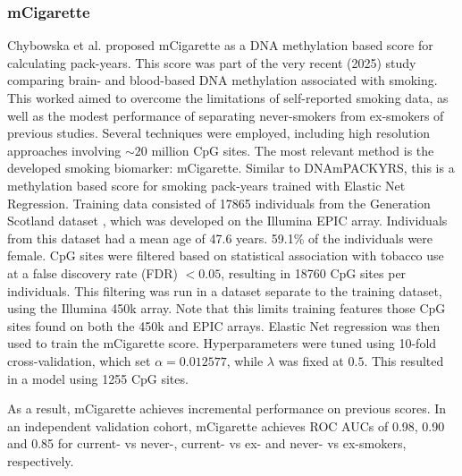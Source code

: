 \documentclass{article}
\begin{document}

\subsubsection{mCigarette} \label{sec:mcigarette}
Chybowska et al. \cite{chybowska2025blood} proposed mCigarette as a DNA methylation based score for calculating pack-years. This score was part of the very recent (2025) study comparing brain- and blood-based DNA methylation associated with smoking. This worked aimed to overcome the limitations of self-reported smoking data, as well as the modest performance of separating never-smokers from ex-smokers of previous studies. Several techniques were employed, including high resolution approaches involving \(\sim \! 20\) million CpG sites. The most relevant method is the developed smoking biomarker: mCigarette. Similar to DNAmPACKYRS, this is a methylation based score for smoking pack-years trained with Elastic Net Regression. Training data consisted of \num{17865} individuals from the Generation Scotland dataset \cite{smith2006generation}, which was developed on the Illumina EPIC array. Individuals from this dataset had a mean age of 47.6 years. 59.1\% of the individuals were female. CpG sites were filtered based on statistical association with tobacco use at a false discovery rate (FDR) \(< 0.05\), resulting in \num{18760} CpG sites per individuals. This filtering was run in a dataset separate to the training dataset, using the Illumina 450k array. Note that this limits training features those CpG sites found on both the 450k and EPIC arrays. Elastic Net regression was then used to train the mCigarette score. Hyperparameters were tuned using 10-fold cross-validation, which set \(\alpha = 0.012577\), while \(\lambda\) was fixed at \(0.5\). This resulted in a model using \num{1255} CpG sites.

As a result, mCigarette achieves incremental performance on previous scores. In an independent validation cohort, mCigarette achieves ROC AUCs of 0.98, 0.90 and 0.85 for current- vs never-, current- vs ex- and never- vs ex-smokers, respectively.
\end{document}

